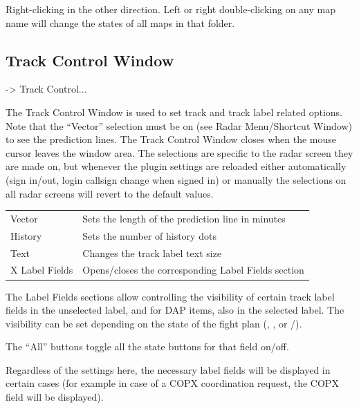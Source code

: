 \documentclass[a4paper,oneside,11pt]{memoir}
\begin{document}
\bigskip

Right-clicking in the other direction. Left or right double-clicking on any map name will change the states of all maps in that folder.

\subsection{Track Control Window}
\label{win:tcw}

 -> Track Control...

\bigskip

The Track Control Window is used to set track and track label related options. Note that the “Vector” selection must be on (see Radar Menu/Shortcut Window) to see the prediction lines. The Track Control Window closes when the mouse cursor leaves the window area. The selections are specific to the radar screen they are made on, but whenever the plugin settings are reloaded either automatically (sign in/out, login callsign change when signed in) or manually the selections on all radar screens will revert to the default values.


\begin{longtable}{p{2.5cm} p{10cm}}
    Vector          & Sets the length of the prediction line in minutes\\
    History         & Sets the number of history dots\\
    Text            & Changes the track label text size\\
    X Label Fields  & Opens/closes the corresponding Label Fields section\\
\end{longtable}

\bigskip

The Label Fields sections allow controlling the visibility of certain track label fields in the unselected label, and for DAP items, also in the selected label. The visibility can be set depending on the state of the fight plan (, ,  or /).

\bigskip

The “All” buttons toggle all the state buttons for that field on/off.

\bigskip

Regardless of the settings here, the necessary label fields will be displayed in certain cases (for example in case of a COPX coordination request, the COPX field will be displayed).
\end{document}
